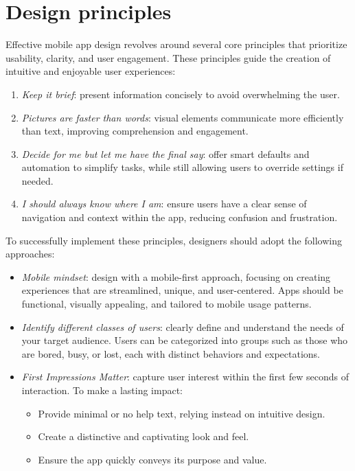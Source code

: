 \section{Design principles}

Effective mobile app design revolves around several core principles that prioritize usability, clarity, and user engagement. These principles guide the creation of intuitive and enjoyable user experiences:
\begin{enumerate} 
    \item \textit{Keep it brief}: present information concisely to avoid overwhelming the user. 
    \item \textit{Pictures are faster than words}: visual elements communicate more efficiently than text, improving comprehension and engagement.
    \item \textit{Decide for me but let me have the final say}: offer smart defaults and automation to simplify tasks, while still allowing users to override settings if needed. 
    \item \textit{I should always know where I am}: ensure users have a clear sense of navigation and context within the app, reducing confusion and frustration. 
\end{enumerate}

To successfully implement these principles, designers should adopt the following approaches:
\begin{itemize} 
    \item \textit{Mobile mindset}: design with a mobile-first approach, focusing on creating experiences that are streamlined, unique, and user-centered. 
        Apps should be functional, visually appealing, and tailored to mobile usage patterns.
    \item \textit{Identify different classes of users}: clearly define and understand the needs of your target audience. 
        Users can be categorized into groups such as those who are bored, busy, or lost, each with distinct behaviors and expectations.
    \item \textit{First Impressions Matter}: capture user interest within the first few seconds of interaction. 
        To make a lasting impact:
        \begin{itemize}
            \item Provide minimal or no help text, relying instead on intuitive design.
            \item Create a distinctive and captivating look and feel.
            \item Ensure the app quickly conveys its purpose and value.
        \end{itemize}
\end{itemize}